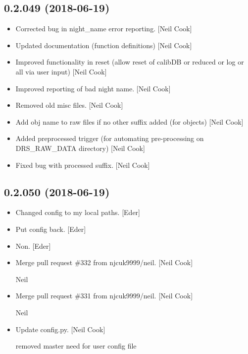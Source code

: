 \documentclass[a4paper,10pt,english]{report}
\begin{document}
\subsection{0.2.049 (2018-06-19)}
\label{\detokenize{misc/changelog:id414}}\begin{itemize}
\item {} 
Corrected bug in night\_name error reporting. {[}Neil Cook{]}

\item {} 
Updated documentation (function definitions) {[}Neil Cook{]}

\item {} 
Improved functionality in reset (allow reset of calibDB or reduced or
log or all via user input) {[}Neil Cook{]}

\item {} 
Improved reporting of bad night name. {[}Neil Cook{]}

\item {} 
Removed old misc files. {[}Neil Cook{]}

\item {} 
Add obj name to raw files if no other suffix added (for objects) {[}Neil
Cook{]}

\item {} 
Added preprocessed trigger (for automating pre-processing on
DRS\_RAW\_DATA directory) {[}Neil Cook{]}

\item {} 
Fixed bug with processed suffix. {[}Neil Cook{]}

\end{itemize}


\subsection{0.2.050 (2018-06-19)}
\label{\detokenize{misc/changelog:id415}}\begin{itemize}
\item {} 
Changed config to my local paths. {[}Eder{]}

\item {} 
Put config back. {[}Eder{]}

\item {} 
Non. {[}Eder{]}

\item {} 
Merge pull request \#332 from njcuk9999/neil. {[}Neil Cook{]}

Neil

\item {} 
Merge pull request \#331 from njcuk9999/neil. {[}Neil Cook{]}

Neil

\item {} 
Update config.py. {[}Neil Cook{]}

removed master need for user config file

\end{itemize}
\end{document}
